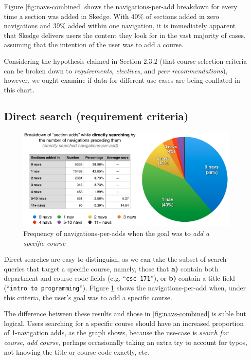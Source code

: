 Figure \ref{fig:navs-combined} shows the navigations-per-add breakdown for every time a section was added in Skedge. With 40\% of sections added in zero navigations and 39\% added within one navigation, it is immediately apparent that Skedge delivers users the content they look for in the vast majority of cases, assuming that the intention of the user was to add a course.

Considering the hypothesis claimed in Section 2.3.2 (that course selection criteria can be broken down to \emph{requirements}, \emph{electives}, and \emph{peer recommendations}), however, we ought examine if data for different use-cases are being conflated in this chart.

\subsection{Direct search (requirement criteria)}

  \begin{figure}
    \centering
    \includegraphics[width=1.0\textwidth]{images/graph/direct_navs}

    \caption{Frequency of navigations-per-adds when the goal was to \emph{add a specific course}}
    \label{fig:navs-direct}
  \end{figure}

  Direct searches are easy to distinguish, as we can take the subset of search queries that target a specific course, namely, those that \textbf{a)} contain both department and course code fields (e.g. ``{\tt csc 171}''), or \textbf{b)} contain a title field (``{\tt intro to programming}''). Figure \ref{fig:navs-direct} shows the navigations-per-add when, under this criteria, the user's goal was to add a specific course.

  The difference between these results and those in \ref{fig:navs-combined} is suble but logical. Users searching for a specific course should have an increased proportion of 1-navigation adds, as the graph shows, because the use-case is \emph{search for course}, \emph{add course}, perhaps occasionally taking an extra try to account for typos, not knowing the title or course code exactly, etc.

